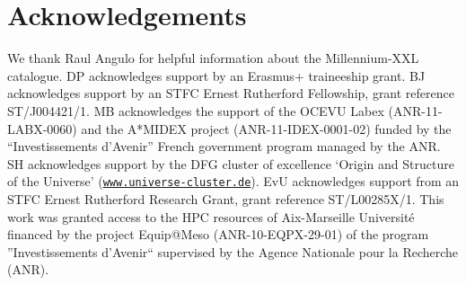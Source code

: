 \documentclass[a4paper,fleqn,usenatbib]{mnras}
\begin{document}

\section*{Acknowledgements}
We thank Raul Angulo for helpful information about the Millennium-XXL catalogue. DP acknowledges support by an Erasmus+ traineeship grant. BJ acknowledges support by an STFC Ernest Rutherford Fellowship, grant reference ST/J004421/1. MB acknowledges the support of the OCEVU Labex (ANR-11-LABX-0060) and the A*MIDEX project (ANR-11-IDEX-0001-02) funded by the ``Investissements d'Avenir'' French government program managed by the ANR. SH acknowledges support by the DFG cluster of excellence \lq{}Origin and Structure of the Universe\rq{} (\href{http://www.universe-cluster.de}{\texttt{www.universe-cluster.de}}). EvU acknowledges support from an STFC Ernest Rutherford Research Grant, grant reference ST/L00285X/1. This work was granted access to the HPC resources of Aix-Marseille Universit\'e financed by the project Equip@Meso (ANR-10-EQPX-29-01) of the program ''Investissements d'Avenir`` supervised by the Agence Nationale pour la Recherche (ANR). 








\end{document}

